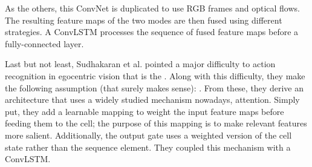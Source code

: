 \documentclass[12pt, a4paper]{report}
\begin{document}
					As the others, this ConvNet is duplicated to use RGB frames and optical flows.
					The resulting feature maps of the two modes are then fused using different strategies.
					A ConvLSTM processes the sequence of fused feature maps before a fully-connected layer.
					\par
					Last but not least, Sudhakaran et al. \cite{sudhakaran2019lsta} pointed a major difficulty to action recognition in egocentric vision that is the .
					Along with this difficulty, they make the following assumption (that surely makes sense): .
					From these, they derive an architecture that uses a widely studied mechanism nowadays, attention.
					Simply put, they add a learnable mapping to weight the input feature maps before feeding them to the cell; the purpose of this mapping is to make relevant features more \gls{salient}.
					Additionally, the output gate uses a weighted version of the cell state rather than the sequence element.
					They coupled this mechanism with a ConvLSTM.
\end{document}
